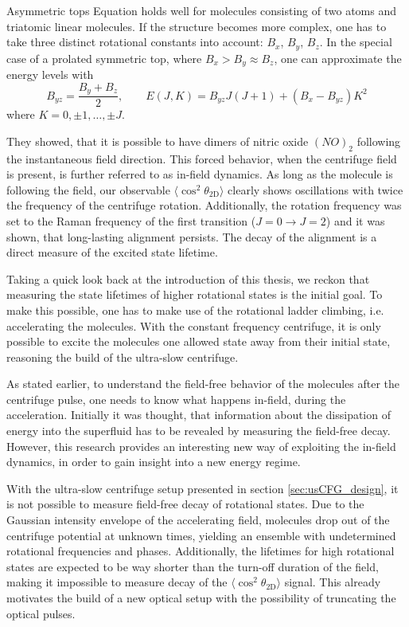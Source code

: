 \begin{aside}{Asymmetric tops}
Equation  holds well for molecules consisting of two atoms and triatomic linear molecules. If the structure becomes more complex, one has to take three distinct rotational constants into account: $B_x$, $B_y$, $B_z$. In the special case of a prolated symmetric top, where $B_x > B_y \approx B_z$, one can approximate the energy levels with
\begin{equation}
B_{yz} = \frac{B_y + B_z}{2},
\qquad
E(J,K) = B_{yz}J(J+1) + (B_x - B_{yz})K^2
\end{equation}
where $K = 0, \pm 1, \dots, \pm J$. \cite{ianThesis}
\end{aside}
They showed, that it is possible to have dimers of nitric oxide $(NO)_2$ following the instantaneous field direction. This forced behavior, when the centrifuge field is present, is further referred to as in-field dynamics. As long as the molecule is following the field, our observable $\langle\cos^2\theta_\mathrm{2D}\rangle$ clearly shows oscillations with twice the frequency of the centrifuge rotation. Additionally, the rotation frequency was set to the Raman frequency of the first transition ($J=0 \rightarrow J=2$) and it was shown, that long-lasting alignment persists. The decay of the alignment is a direct measure of the excited state lifetime. 

Taking a quick look back at the introduction of this thesis, we reckon that measuring the state lifetimes of higher rotational states is the initial goal. To make this possible, one has to make use of the rotational ladder climbing, i.e. accelerating the molecules. With the constant frequency centrifuge, it is only possible to excite the molecules one allowed state away from their initial state, reasoning the build of the ultra-slow centrifuge. 

As stated earlier, to understand the field-free behavior of the molecules after the centrifuge pulse, one needs to know what happens in-field, during the acceleration. Initially it was thought, that information about the dissipation of energy into the superfluid has to be revealed by measuring the field-free decay. However, this research provides an interesting new way of exploiting the in-field dynamics, in order to gain insight into a new energy regime.

With the ultra-slow centrifuge setup presented in section \ref{sec:usCFG_design}, it is not possible to measure field-free decay of rotational states. Due to the Gaussian intensity envelope of the accelerating field, molecules drop out of the centrifuge potential at unknown times, yielding an ensemble with undetermined rotational frequencies and phases. Additionally, the lifetimes for high rotational states are expected to be way shorter than the turn-off duration of the field, making it impossible to measure decay of the $\langle\cos^2\theta_\mathrm{2D}\rangle$ signal. This already motivates the build of a new optical setup with the possibility of truncating the optical pulses.  
